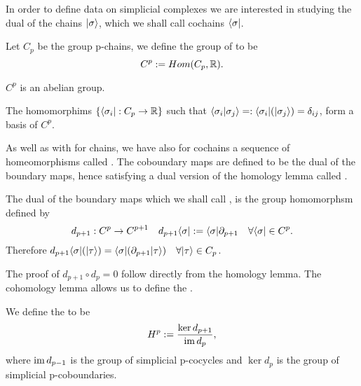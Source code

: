 \documentclass[../1.tex]{subfiles}
\begin{document}
    In order to define data on simplicial complexes we are interested in studying the dual of the chains $| \sigma \rangle$,
    which we shall call cochains $\langle \sigma |$.
       
    \begin{defn}
        Let $C_p$ be the group p-chains, we define the group of  to 
        be \[C^p := Hom(C_p, \mathbb{R}).\]
    \end{defn}

    \begin{prop}
        $C^p$ is an abelian group.
    \end{prop}

    \begin{prop}
        The homomorphims $\{\langle \sigma_i |:C_p \to \mathbb{R}\}$ such that $\langle \sigma_i | \sigma_j \rangle =: \langle \sigma_i |(| \sigma_j \rangle) = \delta_{ij}$,
        form a basis of $C^p$.
    \end{prop}

    As well as with for chains, we have also for cochains a sequence of homeomorphisms called . The coboundary maps are defined
    to be the dual of the boundary maps, hence satisfying a dual version of the homology lemma called .

    \begin{defn}
        The dual of the boundary maps which we shall call
        , is the group homomorphsm defined by
        \[ d_{p+1} : C^p \to C^{p+1} \quad d_{p+1}\langle \sigma | := \langle \sigma | \partial_{p+1} \quad \forall \langle \sigma | \in C^p.\]
        Therefore $d_{p+1}\langle \sigma |(| \tau \rangle) = \langle \sigma | (\partial_{p+1}| \tau \rangle) \quad \forall | \tau \rangle \in C_p$.
    \end{defn}

    The proof of $d_{p+1} \circ d_p = 0$ follow directly from the homology lemma. The cohomology lemma allows us to define the .
    
    \begin{defn}
        We define the  to be 
        \[H^p := \frac{\ker d_{p+1}}{\mathrm{im}\, d_{p}},\] 
        where $\mathrm{im}\, d_{p-1}$ is the group of simplicial p-cocycles and
        $\ker d_p$ is the group of simplicial p-coboundaries.
    \end{defn}

\end{document}
